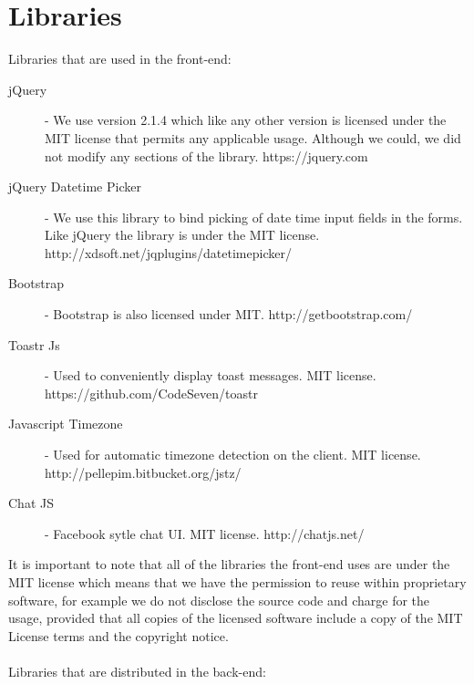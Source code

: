 \documentclass[10pt,a4paper]{article}
\begin{document}
\section{Libraries}
Libraries that are used in the front-end:
\begin{description}
\item[jQuery] - We use version 2.1.4 which like any other version is licensed 
under the MIT license that permits any applicable usage. Although we could, we 
did not modify any sections of the library. https://jquery.com
\item[jQuery Datetime Picker] - We use this library to bind picking of date time 
input fields in the forms. Like jQuery the library is under the MIT license. 
http://xdsoft.net/jqplugins/datetimepicker/
\item[Bootstrap] - Bootstrap is also licensed under MIT. 
http://getbootstrap.com/
\item[Toastr Js] - Used to conveniently display toast messages.
MIT license. https://github.com/CodeSeven/toastr
\item[Javascript Timezone] - Used for automatic timezone detection on the client.
MIT license. http://pellepim.bitbucket.org/jstz/
\item[Chat JS] - Facebook sytle chat UI. MIT license. http://chatjs.net/
\end{description}
It is important to note that all of the libraries the front-end uses are under 
the MIT license which means that we have the permission to reuse within 
proprietary software, for example we do not disclose the source code and charge 
for the usage, provided that all copies of the licensed software include a copy 
of the MIT License terms and the copyright notice. \\ \\
Libraries that are distributed in the back-end:
\end{document}
